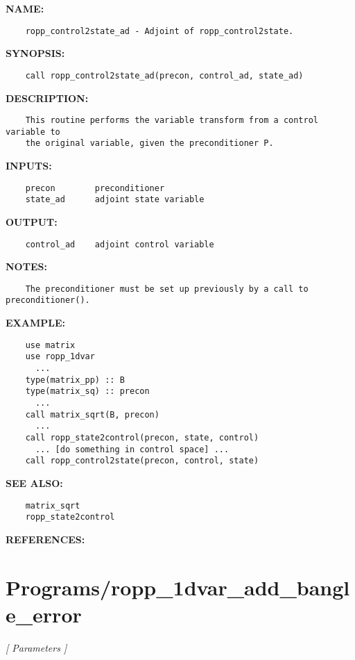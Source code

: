 \label{ch:robo41}
\label{ch:Preconditioning_ropp_control2state_ad}
\textbf{NAME:}\hspace{0.08in}\begin{Verbatim}
    ropp_control2state_ad - Adjoint of ropp_control2state.
\end{Verbatim}
\textbf{SYNOPSIS:}\hspace{0.08in}\begin{Verbatim}
    call ropp_control2state_ad(precon, control_ad, state_ad)
\end{Verbatim}
\textbf{DESCRIPTION:}\hspace{0.08in}\begin{Verbatim}
    This routine performs the variable transform from a control variable to
    the original variable, given the preconditioner P.
\end{Verbatim}
\textbf{INPUTS:}\hspace{0.08in}\begin{Verbatim}
    precon        preconditioner
    state_ad      adjoint state variable
\end{Verbatim}
\textbf{OUTPUT:}\hspace{0.08in}\begin{Verbatim}
    control_ad    adjoint control variable
\end{Verbatim}
\textbf{NOTES:}\hspace{0.08in}\begin{Verbatim}
    The preconditioner must be set up previously by a call to preconditioner().
\end{Verbatim}
\textbf{EXAMPLE:}\hspace{0.08in}\begin{Verbatim}
    use matrix
    use ropp_1dvar
      ...
    type(matrix_pp) :: B
    type(matrix_sq) :: precon
      ...
    call matrix_sqrt(B, precon)
      ...
    call ropp_state2control(precon, state, control)
      ... [do something in control space] ...
    call ropp_control2state(precon, control, state)
\end{Verbatim}
\textbf{SEE ALSO:}\hspace{0.08in}\begin{Verbatim}
    matrix_sqrt
    ropp_state2control
\end{Verbatim}
\textbf{REFERENCES:}\hspace{0.08in}\section{Programs/ropp\_1dvar\_add\_bangle\_error}
\textsl{[ Parameters ]}

